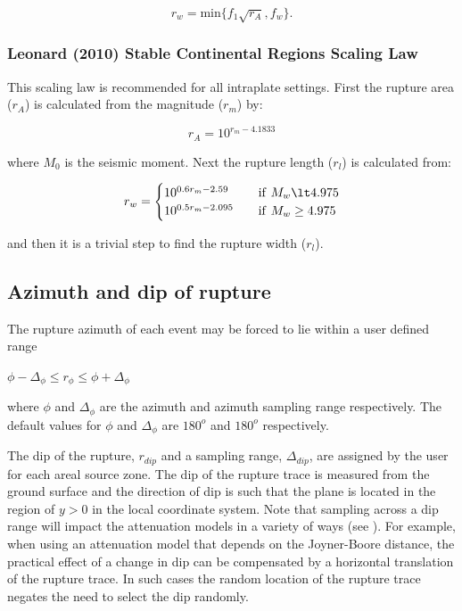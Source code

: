 \begin{equation}
r_w = \textrm{min$\{f_1\sqrt{r_A},f_w\}$}.
\end{equation}

\subsubsection{Leonard (2010) Stable Continental Regions Scaling Law}
This scaling law is recommended for all intraplate settings. First the rupture area ($r_A$) is calculated from the magnitude ($r_m$) by:

\begin{equation}
r_{A} = 10^{r_m-4.1833}
\end{equation}

where $M_{0}$ is the seismic moment. Next the rupture length ($r_l$) is calculated from:

\begin{equation}\label{leonard_rw}
r_w = 
\begin{cases}
10^{0.6r_m-2.59}	& \quad \mbox{if \texttt{$M_w \lt 4.975$}} \\
10^{0.5r_m-2.095}	& \quad \mbox{if \texttt{$M_w \ge 4.975$}} \\
\end{cases}
\end{equation}

and then it is a trivial step to find the rupture width ($r_l$).

\subsection{Azimuth and dip of rupture}
\label{sec:az-dip-rupture}

The rupture azimuth of each event may be forced to lie within a
user defined range
\begin{center} $\phi - \Delta_{\phi} \leq r_\phi \leq \phi + \Delta_{\phi}$ \end{center}
where $\phi$ and $\Delta_{\phi}$ are the azimuth and azimuth sampling range respectively. The
default values for $\phi$ and $\Delta_{\phi}$ are $180^o$ and $180^o$
respectively. 

The dip of the rupture, $r_{dip}$ and a sampling range, $\Delta_{dip}$, are assigned by the 
user for each areal source zone. The dip of the rupture trace is measured from the
ground surface and the direction of dip is such that the plane is
located in the region of $y>0$ in the local coordinate system.
Note that sampling across a dip range will impact the attenuation models in a variety of ways (see ). 
For example, when using an attenuation model that depends 
on the Joyner-Boore distance, the practical effect of a change in dip can be compensated by a
horizontal translation of the rupture trace. In such cases the random
location of the rupture trace negates the need to select the dip randomly.

